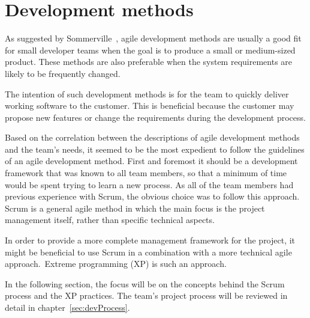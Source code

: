 \section{Development methods}
\label{sec:devMethods}

As suggested by Sommerville~\cite{scrum}, agile development methods are usually a good fit for small developer teams when the goal is to produce a small or medium-sized product. These methods are also preferable when the system requirements are likely to be frequently changed.

The intention of such development methods is for the team to quickly deliver working software to the customer. This is beneficial because the customer may propose new features or change the requirements during the development process.

Based on the correlation between the descriptions of agile development methods and the team's needs, it seemed to be the most expedient to follow the guidelines of an agile development method. First and foremost it should be a development framework that was known to all team members, so that a minimum of time would be spent trying to learn a new process. As all of the team members had previous experience with Scrum, the obvious choice was to follow this approach. Scrum is a general agile method in which the main focus is the project management itself, rather than specific technical aspects.

In order to provide a more complete management framework for the project, it might be beneficial to use Scrum in a combination with a more technical agile approach.~\gls{Extreme programming} (XP) is such an approach.

In the following section, the focus will be on the concepts behind the Scrum process and the XP practices. The team's project process will be reviewed in detail in chapter~\ref{sec:devProcess}.